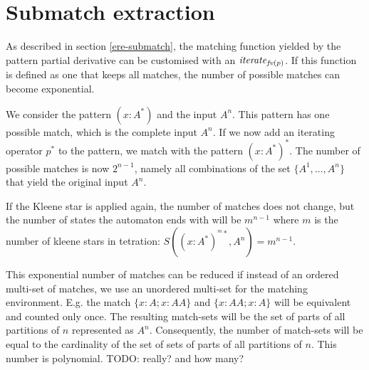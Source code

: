 \section{Submatch extraction}
\label{submatch}

As described in section \ref{ere-submatch}, the matching function yielded by
the pattern partial derivative can be customised with an $\mathit{iterate}_{\mathit{fv}(p)}$. If this
function is defined as one that keeps all matches, the number of possible
matches can become exponential.

We consider the pattern $(x:A^*)$ and the input $A^n$. This pattern has one
possible match, which is the complete input $A^n$. If we now add an iterating
operator $p^*$ to the pattern, we match with the pattern $(x:A^*)^*$. The
number of possible matches is now $2^{n-1}$, namely all combinations of the
set $\{ A^1, \dots, A^n \}$ that yield the original input $A^n$.

If the Kleene star is applied again, the number of matches does not change,
but the number of states the automaton ends with will be $m^{n-1}$ where $m$
is the number of kleene stars in tetration: $S((x:A^*)^{^m*}, A^n) = m^{n-1}$.

This exponential number of matches can be reduced if instead of an ordered
multi-set of matches, we use an unordered multi-set for the matching
environment. E.g. the match $\{ x:A; x:AA \}$ and $\{ x:AA; x:A \}$ will be
equivalent and counted only once. The resulting match-sets will be the set of
parts of all partitions of $n$ represented as $A^n$. Consequently, the number
of match-sets will be equal to the cardinality of the set of sets of parts of
all partitions of $n$. This number is polynomial. TODO: really? and how many?


